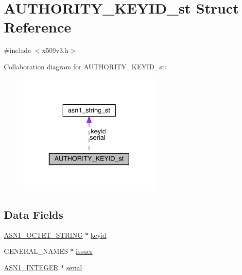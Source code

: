 \hypertarget{struct_a_u_t_h_o_r_i_t_y___k_e_y_i_d__st}{}\section{A\+U\+T\+H\+O\+R\+I\+T\+Y\+\_\+\+K\+E\+Y\+I\+D\+\_\+st Struct Reference}
\label{struct_a_u_t_h_o_r_i_t_y___k_e_y_i_d__st}


{\ttfamily \#include $<$x509v3.\+h$>$}



Collaboration diagram for A\+U\+T\+H\+O\+R\+I\+T\+Y\+\_\+\+K\+E\+Y\+I\+D\+\_\+st\+:\nopagebreak
\begin{figure}[H]
\begin{center}
\leavevmode
\includegraphics[width=203pt]{struct_a_u_t_h_o_r_i_t_y___k_e_y_i_d__st__coll__graph}
\end{center}
\end{figure}
\subsection*{Data Fields}
\begin{DoxyCompactItemize}
\item 
\hyperlink{crypto_2ossl__typ_8h_afbd05e94e0f0430a2b729473efec88c1}{A\+S\+N1\+\_\+\+O\+C\+T\+E\+T\+\_\+\+S\+T\+R\+I\+NG} $\ast$ \hyperlink{struct_a_u_t_h_o_r_i_t_y___k_e_y_i_d__st_a83b8c0c8f3cd449651cb7aa12553acc8}{keyid}
\item 
G\+E\+N\+E\+R\+A\+L\+\_\+\+N\+A\+M\+ES $\ast$ \hyperlink{struct_a_u_t_h_o_r_i_t_y___k_e_y_i_d__st_acc0a343fa32b529f854d31143f693713}{issuer}
\item 
\hyperlink{crypto_2ossl__typ_8h_af4335399bf9774cb410a5e93de65998b}{A\+S\+N1\+\_\+\+I\+N\+T\+E\+G\+ER} $\ast$ \hyperlink{struct_a_u_t_h_o_r_i_t_y___k_e_y_i_d__st_ae89753d950d21e4c15c296fced78c1b6}{serial}
\end{DoxyCompactItemize}


